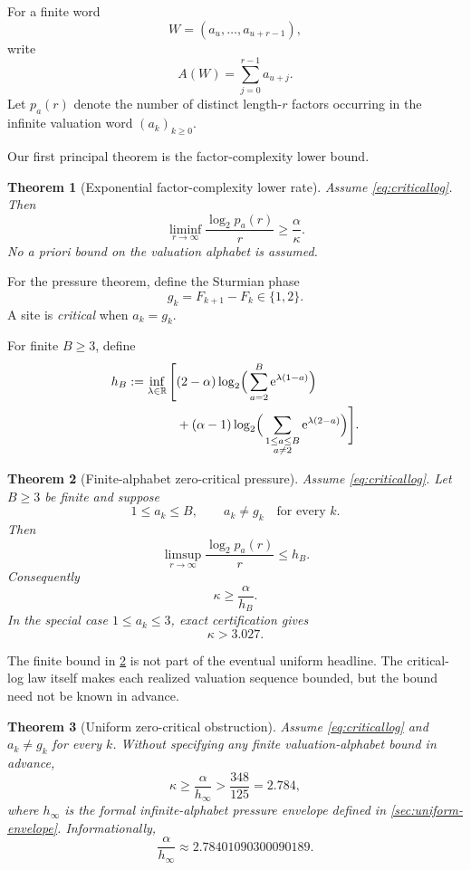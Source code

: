 \documentclass[11pt]{amsart}
\newtheorem{theorem}{Theorem}[section]
\newcommand{\e}{\mathrm e}
\begin{document}
For a finite word
\[
 W=(a_u,\ldots,a_{u+r-1}),
\]
write
\[
 A(W)=\sum_{j=0}^{r-1}a_{u+j}.
\]
Let \(p_a(r)\) denote the number of distinct length-\(r\) factors occurring in the infinite valuation word \((a_k)_{k\ge0}\).

Our first principal theorem is the factor-complexity lower bound.

\begin{theorem}[Exponential factor-complexity lower rate]\label{thm:lower}
Assume \eqref{eq:criticallog}.  Then
\[
 \liminf_{r\to\infty}\frac{\log_2 p_a(r)}{r}
 \ge \frac{\alpha}{\kappa}.
\]
No a priori bound on the valuation alphabet is assumed.
\end{theorem}

For the pressure theorem, define the Sturmian phase
\[
 g_k=F_{k+1}-F_k\in\{1,2\}.
\]
A site is \emph{critical} when \(a_k=g_k\).

For finite \(B\ge3\), define
\begin{align}\label{eq:hB}
 h_B:=\inf_{\lambda\in\mathbb R}\Bigg[&(2-\alpha)
 \log_2\!\Big(\sum_{a=2}^{B}\e^{\lambda(1-a)}\Big)\\
 &+(\alpha-1)
 \log_2\!\Big(\sum_{\substack{1\le a\le B\\a\ne2}}
 \e^{\lambda(2-a)}\Big)\Bigg].\notag
\end{align}

\begin{theorem}[Finite-alphabet zero-critical pressure]\label{thm:pressure}
Assume \eqref{eq:criticallog}.  Let \(B\ge3\) be finite and suppose
\[
 1\le a_k\le B,
 \qquad
 a_k\ne g_k
 \quad\text{for every }k.
\]
Then
\[
 \limsup_{r\to\infty}\frac{\log_2 p_a(r)}{r}\le h_B.
\]
Consequently
\[
 \kappa\ge\frac{\alpha}{h_B}.
\]
In the special case \(1\le a_k\le3\), exact certification gives
\[
 \kappa>3.027.
\]
\end{theorem}

The finite bound in \cref{thm:pressure} is not part of the eventual uniform headline.  The critical-log law itself makes each realized valuation sequence bounded, but the bound need not be known in advance.

\begin{theorem}[Uniform zero-critical obstruction]\label{thm:uniform}
Assume \eqref{eq:criticallog} and \(a_k\ne g_k\) for every \(k\).  Without specifying any finite valuation-alphabet bound in advance,
\[
 \kappa\ge\frac{\alpha}{h_\infty}>\frac{348}{125}=2.784,
\]
where \(h_\infty\) is the formal infinite-alphabet pressure envelope defined in \cref{sec:uniform-envelope}.  Informationally,
\[
 \frac{\alpha}{h_\infty}
 \approx2.78401090300090189.
\]
\end{theorem}
\end{document}
